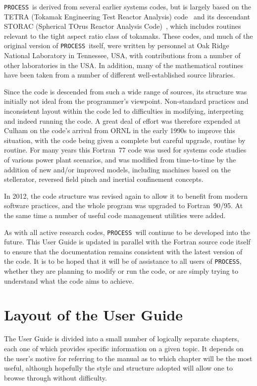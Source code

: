 \documentclass[11pt,a4paper]{report}
\newcommand{\process}{\mbox{\texttt{PROCESS}}}
\begin{document}
\process\ is derived from several earlier systems codes, but is largely based
on the TETRA (Tokamak Engineering Test Reactor Analysis) code~\cite{tetra} and
its descendant STORAC (Spherical TOrus Reactor Analysis Code)~\cite{storac},
which includes routines relevant to the tight aspect ratio class of
tokamaks. These codes, and much of the original version of \process\ itself,
were written by personnel at Oak Ridge National Laboratory in Tennessee, USA,
with contributions from a number of other laboratories in the USA\@. In
addition, many of the mathematical routines have been taken from a number of
different well-established source libraries.

Since the code is descended from such a wide range of sources, its structure
was initially not ideal from the programmer's viewpoint.  Non-standard
practices and inconsistent layout within the code led to difficulties in
modifying, interpreting and indeed running the code. A great deal of effort
was therefore expended at Culham on the code's arrival from ORNL in the early
1990s to improve this situation, with the code being given a complete but
careful upgrade, routine by routine. For many years this Fortran~77 code was
used for systems code studies of various power plant scenarios, and was
modified from time-to-time by the addition of new and/or improved models,
including machines based on the stellerator, reversed field pinch and inertial
confinement concepts.

In 2012, the code structure was revised again to allow it to benefit from
modern software practices, and the whole program was upgraded to
Fortran~90/95. At the same time a number of useful code management utilities
were added.

As with all active research codes, \process\ will continue to be developed
into the future. This User Guide is updated in parallel with the Fortran
source code itself to ensure that the documentation remains consistent with
the latest version of the code. It is to be hoped that it will be of
assistance to all users of \process, whether they are planning to modify or
run the code, or are simply trying to understand what the code aims to
achieve.

\section{Layout of the User Guide}

The User Guide is divided into a small number of logically separate chapters,
each one of which provides specific information on a given topic. It depends
on the user's motive for referring to the manual as to which chapter will be
the most useful, although hopefully the style and structure adopted will allow
one to browse through without difficulty.
\end{document}
